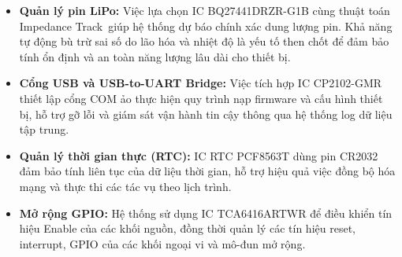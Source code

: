 \begin{itemize}
                        \item \textbf{Quản lý pin LiPo:} 
                        Việc lựa chọn IC BQ27441DRZR-G1B cùng thuật toán Impedance Track\texttrademark\ giúp hệ thống dự báo chính xác dung lượng pin. Khả năng tự động bù trừ sai số do lão hóa và nhiệt độ là yếu tố then chốt để đảm bảo tính ổn định và an toàn năng lượng lâu dài cho thiết bị.

                        \item \textbf{Cổng USB và USB-to-UART Bridge:} 
                        Việc tích hợp IC CP2102-GMR thiết lập cổng COM ảo thực hiện quy trình nạp firmware và cấu hình thiết bị, hỗ trợ gỡ lỗi và giám sát vận hành tin cậy thông qua hệ thống log dữ liệu tập trung.
                        
                        \item \textbf{Quản lý thời gian thực (RTC):} 
                        IC RTC PCF8563T dùng pin CR2032 đảm bảo tính liên tục của dữ liệu thời gian, hỗ trợ hiệu quả việc đồng bộ hóa mạng và thực thi các tác vụ theo lịch trình.
                        
                        \item \textbf{Mở rộng GPIO:} 
                        Hệ thống sử dụng IC TCA6416ARTWR để điều khiển tín hiệu Enable của các khối nguồn, đồng thời quản lý các tín hiệu reset, interrupt, GPIO của các khối ngoại vi và mô-đun mở rộng.


\end{itemize}
